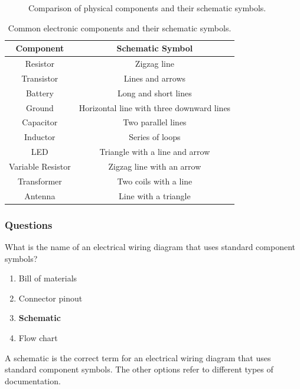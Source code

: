 \begin{figure}[h]
    \centering
    \caption{Comparison of physical components and their schematic symbols.}
    \label{fig:component-symbols}
\end{figure}

\begin{table}[h]
    \centering
    \begin{tabular}{|c|c|}
        \hline
        \textbf{Component} & \textbf{Schematic Symbol} \\
        \hline
        Resistor & Zigzag line \\
        Transistor & Lines and arrows \\
        Battery & Long and short lines \\
        Ground & Horizontal line with three downward lines \\
        Capacitor & Two parallel lines \\
        Inductor & Series of loops \\
        LED & Triangle with a line and arrow \\
        Variable Resistor & Zigzag line with an arrow \\
        Transformer & Two coils with a line \\
        Antenna & Line with a triangle \\
        \hline
    \end{tabular}
    \caption{Common electronic components and their schematic symbols.}
    \label{tab:component-symbols}
\end{table}

\subsubsection*{Questions}

\begin{tcolorbox}[colback=gray!10!white,colframe=black!75!black,title={T6C01}]
    What is the name of an electrical wiring diagram that uses standard component symbols?
    \begin{enumerate}[label=\Alph*),noitemsep]
        \item Bill of materials
        \item Connector pinout
        \item \textbf{Schematic}
        \item Flow chart
    \end{enumerate}
\end{tcolorbox}
A schematic is the correct term for an electrical wiring diagram that uses standard component symbols. The other options refer to different types of documentation.



